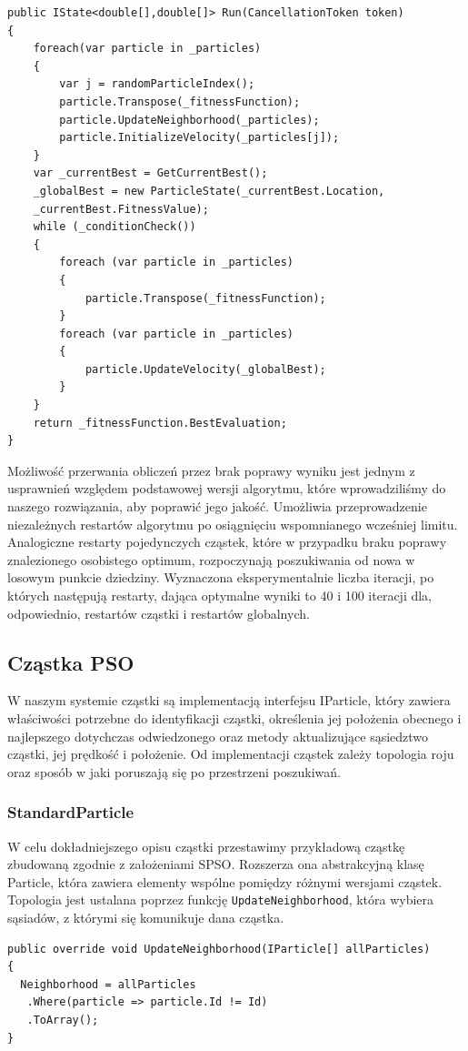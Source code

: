 \documentclass[12pt, twoside, openany, abstract=on]{report}
\theoremstyle{definition}
\begin{document}
\lstset{style=sharpc}
\begin{lstlisting}[frame=single]
public IState<double[],double[]> Run(CancellationToken token)
{
	foreach(var particle in _particles)
	{
		var j = randomParticleIndex();	      
		particle.Transpose(_fitnessFunction);
	    particle.UpdateNeighborhood(_particles);
		particle.InitializeVelocity(_particles[j]);
	}
	var _currentBest = GetCurrentBest();
	_globalBest = new ParticleState(_currentBest.Location,
	_currentBest.FitnessValue);
	while (_conditionCheck())
	{
		foreach (var particle in _particles)
		{
	    	particle.Transpose(_fitnessFunction);
	    }
		foreach (var particle in _particles)
	    {
			particle.UpdateVelocity(_globalBest);
		}
	}
	return _fitnessFunction.BestEvaluation;
}
\end{lstlisting}

Możliwość przerwania obliczeń przez brak poprawy wyniku jest jednym z usprawnień względem podstawowej wersji algorytmu, które wprowadziliśmy do naszego rozwiązania, aby poprawić jego jakość. Umożliwia przeprowadzenie niezależnych restartów algorytmu po osiągnięciu wspomnianego wcześniej limitu. Analogiczne restarty pojedynczych cząstek, które w przypadku braku poprawy znalezionego osobistego optimum, rozpoczynają poszukiwania od nowa w losowym punkcie dziedziny. Wyznaczona eksperymentalnie liczba iteracji, po których następują restarty, dająca optymalne wyniki to 40 i 100 iteracji dla, odpowiednio, restartów cząstki i restartów globalnych.

\subsection{Cząstka PSO}
W naszym systemie cząstki są implementacją interfejsu IParticle, który zawiera właściwości potrzebne do identyfikacji cząstki, określenia jej położenia obecnego i najlepszego dotychczas odwiedzonego oraz metody   aktualizujące sąsiedztwo cząstki, jej prędkość i położenie. Od implementacji cząstek zależy topologia roju oraz sposób w jaki poruszają się po przestrzeni poszukiwań. 

\subsubsection{StandardParticle}
W celu dokładniejszego opisu cząstki przestawimy przykładową cząstkę zbudowaną zgodnie z założeniami SPSO. %
Rozszerza ona abstrakcyjną klasę Particle, która zawiera elementy wspólne pomiędzy różnymi wersjami cząstek. Topologia jest ustalana poprzez funkcję \texttt{UpdateNeighborhood}, która wybiera sąsiadów, z którymi się komunikuje dana cząstka.
\lstset{style=sharpc}
\begin{lstlisting}[frame=single]
public override void UpdateNeighborhood(IParticle[] allParticles)
{
  Neighborhood = allParticles
   .Where(particle => particle.Id != Id)
   .ToArray();
}
\end{lstlisting}
\end{document}
